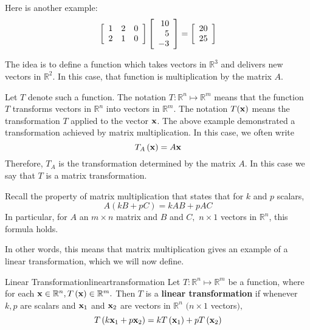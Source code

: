 \begin{solution}
Here is another example:
\begin{equation*}
\left[
\begin{array}{rrr}
1 & 2 & 0 \\
2 & 1 & 0
\end{array}
\right] \left[
\begin{array}{r}
10 \\
5 \\
-3
\end{array}
\right] =\allowbreak \left[
\begin{array}{r}
20 \\
25
\end{array}
\right]
\end{equation*}
\end{solution}

The idea is to define a function which takes vectors in
$\mathbb{R}^{3}$ and delivers new vectors in $\mathbb{R}^{2}.$ In this
case, that function is multiplication by the matrix $A$.

Let $T$ denote such a function. The notation $T:\mathbb{R}^{n}\mapsto \mathbb{R}^{m}$ means that the function $T$
transforms vectors in $\mathbb{R}^{n}$ into vectors in $\mathbb{R}^{m}$. The notation $T({\bf x})$ means the transformation $T$ applied to the vector ${\bf x}$. The above example demonstrated a transformation achieved by matrix multiplication. In this case,  we often write
\begin{equation*}
T_{A}\left( {\bf x}\right) =A {\bf x}
\end{equation*}
Therefore, $T_{A}$ is the transformation determined by the matrix $A$. In this case we say that $T$ is a matrix transformation. 

Recall the property of matrix multiplication that states that for 
$k $ and $p$ scalars,
\begin{equation*}
A\left( kB+pC\right) =kAB+pAC
\end{equation*}
In particular, for $A$ an $m\times n$ matrix and $B$ and $C,$ $n\times 1$
vectors in $\mathbb{R}^{n}$,  this formula holds.

In other words, this means that matrix multiplication gives an
example of a linear transformation, which we will now define. 

\begin{definition}{Linear Transformation}{lineartransformation}
 Let $T:\mathbb{R}^{n}\mapsto \mathbb{R}^{m}$ be a function, where for each
${\bf x} \in \mathbb{R}^{n},T\left({\bf x}\right)\in \mathbb{R}^{m}.$ Then $T$ is a
\textbf{linear transformation} if whenever $k ,p $ are scalars and 
${\bf x}_1$ and ${\bf x}_2$ are vectors in $\mathbb{R}^{n}$ $(
n\times 1$ vectors$),$
\begin{equation*}
T\left( k {\bf x}_1 + p {\bf x}_2 \right) = kT\left({\bf x}_1\right)+ pT\left({\bf x}_{2} \right)
\end{equation*}
\end{definition}

